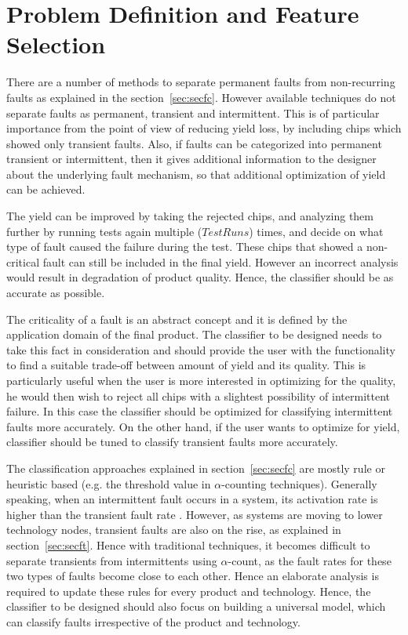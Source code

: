 \chapter{Problem Definition and Feature Selection}
\label{chap:chapter4}

There are a number of methods to separate permanent faults from non-recurring faults as explained in the section~\ref{sec:secfc}. However available techniques do not separate faults as permanent, transient and intermittent. This is of particular importance from the point of view of reducing yield loss, by including chips which showed only transient faults. Also, if faults can be categorized into permanent transient or intermittent, then it gives additional information to the designer about the underlying fault mechanism, so that additional optimization of yield can be achieved. 

The yield can be improved by taking the rejected chips, and analyzing them further by running tests again multiple ($TestRuns$) times, and decide on what type of fault caused the failure during the test. These chips that showed a non-critical fault can still be included in the final yield. However an incorrect analysis would result in degradation of product quality. Hence, the classifier should be as accurate as possible.

The criticality of a fault is an abstract concept and it is defined by the application domain of the final product. The classifier to be designed needs to take this fact in consideration and should provide the user with the functionality to find a suitable trade-off between amount of yield and its quality. This is particularly useful when the user is more interested in optimizing for the quality, he would then wish to reject all chips with a slightest possibility of intermittent failure. In this case the classifier should be optimized for classifying intermittent faults more accurately. On the other hand, if the user wants to optimize for yield, classifier should be tuned to classify transient faults more accurately.

The classification approaches explained in section~\ref{sec:secfc} are mostly rule or heuristic based (e.g. the threshold value in $\alpha$-counting techniques). Generally speaking, when an intermittent fault occurs in a system, its activation rate is higher than the transient fault rate \cite{Bondavalli2000}. However, as systems are moving to lower technology nodes, transient faults are also on the rise, as explained in section~\ref{sec:secft}. Hence with traditional techniques, it becomes difficult to separate transients from intermittents using $\alpha$-count, as the fault rates for these two types of faults become close to each other. Hence an elaborate analysis is required to update these rules for every product and technology. Hence, the classifier to be designed should also focus on building a universal model, which can classify faults irrespective of the product and technology.

